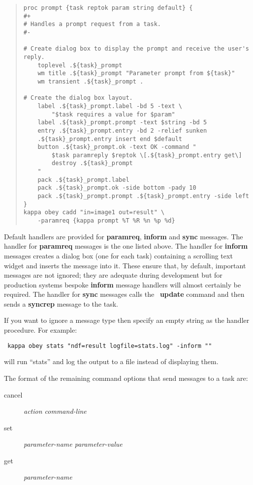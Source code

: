 \begin{quote}
\begin{verbatim}
proc prompt {task reptok param string default} {
#+
# Handles a prompt request from a task.
#-

# Create dialog box to display the prompt and receive the user's reply.
    toplevel .${task}_prompt
    wm title .${task}_prompt "Parameter prompt from ${task}"
    wm transient .${task}_prompt .

# Create the dialog box layout.
    label .${task}_prompt.label -bd 5 -text \
        "$task requires a value for $param"
    label .${task}_prompt.prompt -text $string -bd 5
    entry .${task}_prompt.entry -bd 2 -relief sunken
    .${task}_prompt.entry insert end $default
    button .${task}_prompt.ok -text OK -command "
        $task paramreply $reptok \[.${task}_prompt.entry get\]
        destroy .${task}_prompt
    "
    pack .${task}_prompt.label
    pack .${task}_prompt.ok -side bottom -pady 10
    pack .${task}_prompt.prompt .${task}_prompt.entry -side left
}
kappa obey cadd "in=image1 out=result" \
    -paramreq {kappa prompt %T %R %n %p %d}
\end{verbatim}
\end{quote}

Default handlers are provided for {\bf paramreq}, {\bf inform} and {\bf sync}
messages. The handler for {\bf paramreq} messages is the one listed above. The
handler for {\bf inform} messages creates a dialog box (one for each task)
containing a scrolling text widget and inserts the message into it. These
ensure that, by default, important messages are not ignored; they are
adequate during
development but for production systems bespoke {\bf inform} message handlers
will almost certainly be required. The handler for {\bf sync} messages
calls the \Tcl\ {\bf update} command and then sends a {\bf syncrep} message to
the task.

If you want to ignore a message type then specify an empty string as
the handler procedure. For example:
\begin{tquote}{\tt
kappa obey stats "ndf=result logfile=stats.log" -inform ""
}\end{tquote}
will run ``stats'' and log the output to a file instead of displaying them.

The format of the remaining command options that send messages to a task are:
\begin{description}
\item[cancel] {\em action command-line}
\item[set] {\em parameter-name parameter-value}
\item[get] {\em parameter-name}
\end{description}

